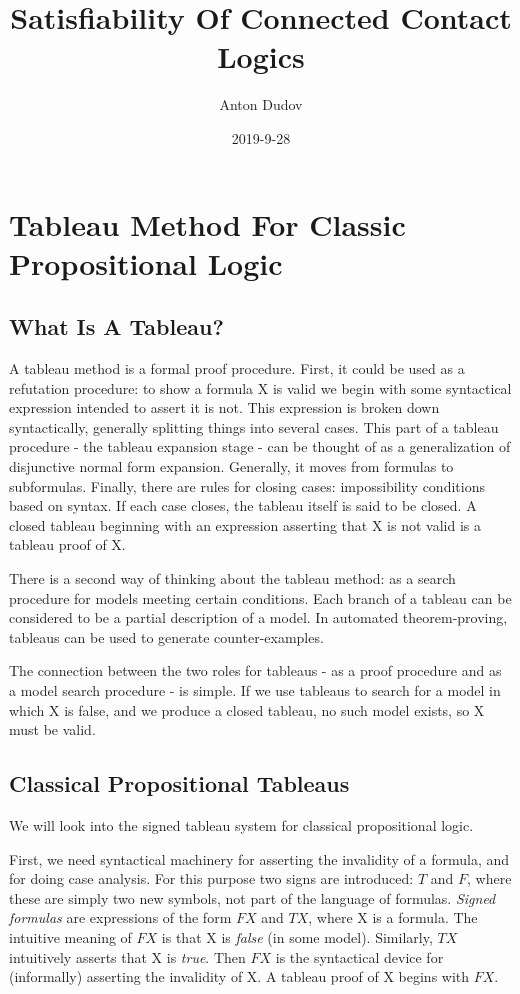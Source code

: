 \documentclass{article}
\title{Satisfiability Of Connected Contact Logics}
\date{2019-9-28}
\author{Anton Dudov}
\begin{document}
	\maketitle
	\newpage

	\tableofcontents

	\newpage

	\section{Tableau Method For Classic Propositional Logic}

	\subsection{What Is A Tableau?}
	A tableau method is a formal proof procedure. First, it could be used as a refutation procedure: to show a formula X is valid we begin with some syntactical expression intended to assert it is not. This expression is broken down syntactically, generally splitting things into several cases. This part of a tableau procedure - the tableau expansion stage - can be thought of as a generalization of disjunctive normal form expansion. Generally, it moves from formulas to subformulas. Finally, there are rules for closing cases: impossibility conditions based on syntax. If each case closes, the tableau itself is said to be closed. A closed tableau beginning with an expression asserting that X is not valid is a tableau proof of X. \par	
	There is a second way of thinking about the tableau method: as a search procedure for models meeting certain conditions. Each branch of a tableau can be considered to be a partial description of a model. In automated theorem-proving, tableaus can be used to generate counter-examples. \par	
	The connection between the two roles for tableaus - as a proof procedure and as a model search procedure - is simple. If we use tableaus to search for a model in which X is false, and we produce a closed tableau, no such model exists, so X must be valid.

	\subsection{Classical Propositional Tableaus}
	We will look into the signed tableau system for classical propositional logic.

	\par
	First, we need syntactical machinery for asserting the invalidity of a formula, and for doing case analysis. For this purpose two signs are introduced: $T$ and $F$, where these are simply two new symbols, not part of the language of formulas. \textit{Signed formulas} are expressions of the form $F X$ and $T X$, where X is a formula. The intuitive meaning of $F X$ is that X is \textit{false} (in some model). Similarly, $T X$ intuitively asserts that X is \textit{true}. Then $F X$ is the syntactical device for (informally) asserting the invalidity of X. A tableau proof of X begins with $F X$.
\end{document}
